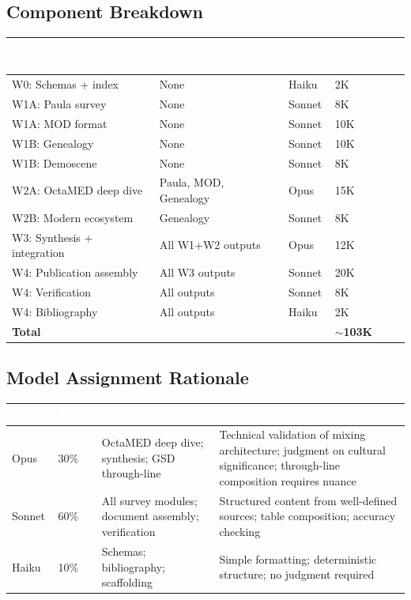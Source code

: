\documentclass[11pt,letterpaper]{article}
\newcommand{\tableheader}[1]{\textbf{\sffamily\textcolor{white}{#1}}}
\begin{document}
\subsection{Component Breakdown}

\begin{center}
\begin{tabularx}{\textwidth}{L{3cm}L{3cm}C{2cm}C{2cm}}
\toprule
{}
\tableheader{Component} & \tableheader{Dependencies} & \tableheader{Model} & \tableheader{Est. Tokens} \\
\midrule
W0: Schemas + index & None & Haiku & 2K \\
W1A: Paula survey & None & Sonnet & 8K \\
W1A: MOD format & None & Sonnet & 10K \\
W1B: Genealogy & None & Sonnet & 10K \\
W1B: Demoscene & None & Sonnet & 8K \\
W2A: OctaMED deep dive & Paula, MOD, Genealogy & Opus & 15K \\
W2B: Modern ecosystem & Genealogy & Sonnet & 8K \\
W3: Synthesis + integration & All W1+W2 outputs & Opus & 12K \\
W4: Publication assembly & All W3 outputs & Sonnet & 20K \\
W4: Verification & All outputs & Sonnet & 8K \\
W4: Bibliography & All outputs & Haiku & 2K \\
\midrule
\textbf{Total} & & & \textbf{$\sim$103K} \\
\bottomrule
\end{tabularx}
\end{center}

\subsection{Model Assignment Rationale}

\begin{center}
\begin{tabularx}{\textwidth}{L{2cm}C{1.5cm}L{3.5cm}X}
\toprule
{}
\tableheader{Model} & \tableheader{Alloc.} & \tableheader{Tasks} & \tableheader{Rationale} \\
\midrule
Opus & 30\% & OctaMED deep dive; synthesis; GSD through-line & Technical validation of mixing architecture; judgment on cultural significance; through-line composition requires nuance \\
Sonnet & 60\% & All survey modules; document assembly; verification & Structured content from well-defined sources; table composition; accuracy checking \\
Haiku & 10\% & Schemas; bibliography; scaffolding & Simple formatting; deterministic structure; no judgment required \\
\bottomrule
\end{tabularx}
\end{center}
\end{document}
